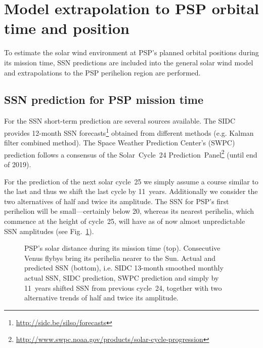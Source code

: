\section{Model extrapolation to PSP orbital time and position}
\label{sec:model_extrapolation_to_psp_orbital_time_and_position}
To estimate the solar wind environment at PSP's planned orbital positions during its mission time, SSN predictions are included into the general solar wind model and extrapolations to the PSP perihelion region are performed.

\subsection{SSN prediction for PSP mission time}
For the SSN short-term prediction are several sources available. The SIDC provides 12-month SSN forecasts\footnote{\url{http://sidc.be/silso/forecasts}} obtained from different methods (e.g. Kalman filter combined method). The Space Weather Prediction Center's (SWPC) prediction follows a consensus of the Solar~Cycle~24 Prediction~Panel\footnote{\url{http://www.swpc.noaa.gov/products/solar-cycle-progression}} (until end of 2019).

For the prediction of the next solar cycle~25 we simply assume a course similar to the last and thus we shift the last cycle by 11~years. Additionally we consider the two alternatives of half and twice its amplitude. The SSN for PSP's first perihelion will be small---certainly below 20, whereas its nearest perihelia, which commence at the height of cycle~25, will have as of now almost unpredictable SSN amplitudes (see Fig.~\ref{fig:SPP_orbit_predicted_SSN_overview_e_plot}).
\begin{figure}
	\caption{PSP's solar distance during its mission time (top). Consecutive Venus flybys bring its perihelia nearer to the Sun. Actual and predicted SSN (bottom), i.e. SIDC 13-month smoothed monthly actual SSN, SIDC prediction, SWPC prediction and simply by 11~years shifted SSN from previous cycle~24, together with two alternative trends of half and twice its amplitude.}
	\label{fig:SPP_orbit_predicted_SSN_overview_e_plot}
\end{figure}

